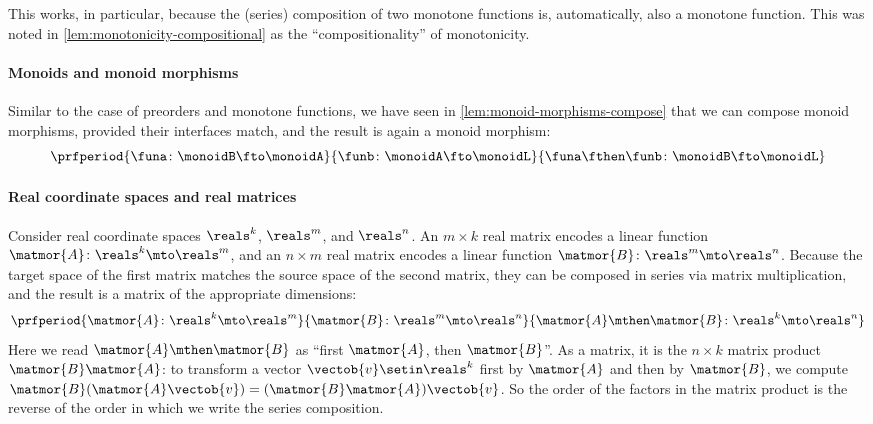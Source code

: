 This works, in particular, because the (series) composition of two monotone functions is, automatically, also a monotone function. This was noted in \cref{lem:monotonicity-compositional} as the ``compositionality'' of monotonicity. 


\paragraph{Monoids and monoid morphisms} Similar to the case of preorders and monotone functions, we have seen in \cref{lem:monoid-morphisms-compose} that we can compose monoid morphisms, provided their interfaces match, and the result is again a monoid morphism:
\begin{equation}
    \label{eq:interfaces-monoids}
    \prfperiod{
        \funa \colon \monoidB \fto \monoidA
    }{
        \funb \colon \monoidA \fto \monoidL
    }{
        \funa \fthen \funb \colon \monoidB \fto \monoidL
    }
\end{equation}


\paragraph{Real coordinate spaces and real matrices}
Consider real coordinate spaces $\reals^k$, $\reals^m$, and $\reals^n$. An $m \times k$ real matrix encodes a linear function $\matmor{A} \colon \reals^k \mto \reals^m$, and an $n \times m$ real matrix encodes a linear function $\matmor{B} \colon \reals^m \mto \reals^n$. Because the target space of the first matrix matches the source space of the second matrix, they can be composed in series via matrix multiplication, and the result is a matrix of the appropriate dimensions: 
\begin{equation}
    \label{eq:interfaces-matrices}
    \prfperiod{
        \matmor{A} \colon \reals^k \mto \reals^m
    }{
        \matmor{B} \colon \reals^m \mto \reals^n
    }{
        \matmor{A} \mthen \matmor{B} \colon \reals^k \mto \reals^n
    }
\end{equation}
Here we read $\matmor{A} \mthen \matmor{B}$ as ``first $\matmor{A}$, then $\matmor{B}$''. As a matrix, it is the $n \times k$ matrix product $\matmor{B}\matmor{A}$: to transform a vector $\vectob{v} \setin \reals^k$ first by $\matmor{A}$ and then by $\matmor{B}$, we compute $\matmor{B}(\matmor{A}\vectob{v}) = (\matmor{B}\matmor{A})\vectob{v}$. So the order of the factors in the matrix product is the reverse of the order in which we write the series composition.

